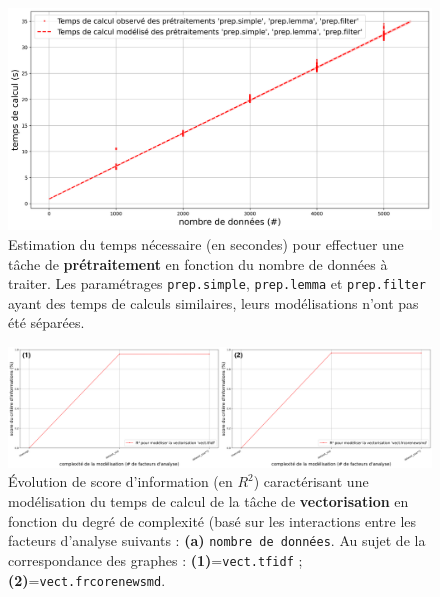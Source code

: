 			\begin{figure}[H]
				\centering
				\includegraphics[width=\textwidth]{figures/etude-temps-calcul-modelisation-1prep}
				\caption{Estimation du temps nécessaire (en secondes) pour effectuer une tâche de \textbf{prétraitement} en fonction du nombre de données à traiter. Les paramétrages \texttt{prep.simple}, \texttt{prep.lemma} et \texttt{prep.filter} ayant des temps de calculs similaires, leurs modélisations n'ont pas été séparées.}
				\label{figure:4.3.1-ETUDE-COUTS-TEMPS-CALCUL-MODELISATION-PREPROCESSING}
			\end{figure}
			
			
			\begin{figure}[H]
				\centering
				\includegraphics[width=\textwidth]{figures/etude-temps-calcul-analyse-facteurs-2vect}
				\caption{Évolution de score d'information (en \(R^2\)) caractérisant une modélisation du temps de calcul de la tâche de \textbf{vectorisation} en fonction du degré de complexité (basé sur les interactions entre les facteurs d'analyse suivants : \textbf{(a)} \texttt{nombre de données}. Au sujet de la correspondance des graphes : \textbf{(1)}=\texttt{vect.tfidf} ; \textbf{(2)}=\texttt{vect.frcorenewsmd}.}
				\label{figure:4.3.1-ETUDE-COUTS-TEMPS-CALCUL-ANALYSE-FACTEURS-VECTORIZATION}
			\end{figure}
		
